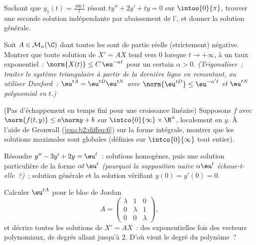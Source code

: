 \begin{exercise}[$\star\star$]\label{exo:b2:diffeq:7}
Sachant que $y_1(t) = \frac{\sin t}{t}$ résout $ty'' + 2y' + ty =
0$ sur $\intoo{0}{\pi}$, trouver une seconde solution indépendante
par abaissement de l', et donner la solution générale.
\end{exercise}

\begin{exercise}[$\star\star\star$]\label{exo:b2:diffeq:8}
Soit $A \in \mathcal{M}_n(\C)$ dont toutes les  sont
de partie réelle (strictement) négative. Montrer que toute solution
de $X' = AX$ tend vers $0$ lorsque $t \to +\infty$, à un taux
exponentiel~: $\norm{X(t)} \leq C\,\eu^{-\alpha t}$ pour un certain
$\alpha > 0$.
\emph{(Trigonaliser~; traiter le système triangulaire à partir de
la dernière ligne en remontant, ou utiliser Dunford~: $\eu^{tA} =
\eu^{tD}\eu^{tN}$ avec $\norm{\eu^{tD}} \leq \eu^{-\alpha' t}$ et
$\eu^{tN}$ polynomial en $t$.)}
\end{exercise}

\begin{exercise}[$\star\star\star$]\label{exo:b2:diffeq:9}
(Pas d'échappement en temps fini pour une croissance linéaire)
Supposons $f$  avec $\norm{f(t, y)} \leq a\norm y + b$ sur
$\intco{0}{\infty} \times \R^n$, localement  en $y$.
À l'aide de Gronwall (\cref{exo:b2:diffeq:6}) sur la forme
intégrale, montrer que les solutions maximales sont globales
(définies sur $\intco{0}{\infty}$ tout entier).
\end{exercise}

\begin{exercise}[$\star$]\label{exo:b2:diffeq:10}
Résoudre $y'' - 3y' + 2y = \eu^{t}$~: solutions homogènes, puis une
solution particulière de la forme $\alpha t\,\eu^{t}$ \emph{(pourquoi
la supposition naïve $\alpha\eu^t$ échoue-t-elle~?)}~; solution
générale et la solution vérifiant $y(0) = y'(0) = 0$.
\end{exercise}

\begin{exercise}[$\star\star$]\label{exo:b2:diffeq:11}
Calculer $\eu^{tA}$ pour le bloc de Jordan
\[
A = \begin{pmatrix} \lambda & 1 & 0\\ 0 & \lambda & 1\\
0 & 0 & \lambda\end{pmatrix},
\]
et décrire toutes les solutions de $X' = AX$~: des exponentielles
fois des vecteurs polynomiaux, de degrés allant jusqu'à $2$. D'où
vient le degré du polynôme~?
\end{exercise}

